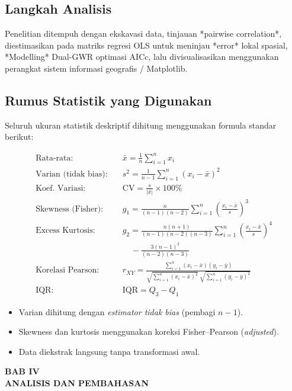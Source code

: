\documentclass[12pt,a4paper]{article}
\begin{document}
\subsection{Langkah Analisis}
Penelitian ditempuh dengan ekskavasi data, tinjauan *pairwise correlation*, diestimasikan pada matriks regresi OLS untuk meninjau *error* lokal spasial, *Modelling* Dual-GWR optimasi AICc, lalu divisualisasikan menggunakan perangkat sistem informasi geografis / Matplotlib.

\subsection{Rumus Statistik yang Digunakan}

Seluruh ukuran statistik deskriptif dihitung menggunakan formula standar berikut:

\begin{align*}
\text{Rata-rata:} \quad & \bar{x} = \frac{1}{n} \sum_{i=1}^{n} x_i \\[6pt]
\text{Varian (tidak bias):} \quad & s^2 = \frac{1}{n-1} \sum_{i=1}^{n} (x_i - \bar{x})^2 \\[6pt]
\text{Koef. Variasi:} \quad & \text{CV} = \frac{s}{|\bar{x}|} \times 100\% \\[6pt]
\text{Skewness (Fisher):} \quad & g_1 = \frac{n}{(n-1)(n-2)} \sum_{i=1}^{n} \left(\frac{x_i - \bar{x}}{s}\right)^3 \\[6pt]
\text{Excess Kurtosis:} \quad & g_2 = \frac{n(n+1)}{(n-1)(n-2)(n-3)} \sum_{i=1}^{n}\left(\frac{x_i-\bar{x}}{s}\right)^4 \\
& \quad - \frac{3(n-1)^2}{(n-2)(n-3)} \\[6pt]
\text{Korelasi Pearson:} \quad & r_{XY} = \frac{\sum_{i=1}^{n}(x_i-\bar{x})(y_i-\bar{y})}
  {\sqrt{\sum_{i=1}^{n}(x_i-\bar{x})^2}\;\sqrt{\sum_{i=1}^{n}(y_i-\bar{y})^2}} \\[6pt]
\text{IQR:} \quad & \text{IQR} = Q_3 - Q_1
\end{align*}

\begin{itemize}
  \item Varian dihitung dengan \textit{estimator tidak bias} (pembagi $n-1$).
  \item Skewness dan kurtosis menggunakan koreksi Fisher--Pearson (\textit{adjusted}).
  \item Data diekstrak langsung tanpa transformasi awal.
\end{itemize}

\newpage
\begin{center}
    \bfseries\large
    BAB IV \\
    ANALISIS DAN PEMBAHASAN
\end{center}
\setcounter{section}{4}
\setcounter{subsection}{0}
\end{document}
